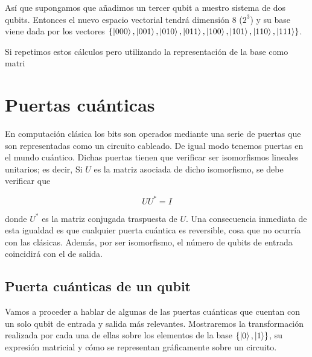Así que supongamos que añadimos un tercer qubit a nuestro sistema de dos qubits. Entonces el nuevo espacio vectorial tendrá dimensión 8 ($2^3$) y su base viene dada por los vectores $\{\left|000\right\rangle,\left|001\right\rangle,\left|010\right\rangle,\left|011\right\rangle,\left|100\right\rangle,\left|101\right\rangle,\left|110\right\rangle,\left|111\right\rangle\}$.

Si repetimos estos cálculos pero utilizando la representación de la base como matri


\section{Puertas cuánticas}

En computación clásica los bits son operados mediante una serie de puertas que son representadas como un circuito cableado. De igual modo tenemos puertas en el mundo cuántico. Dichas puertas tienen que verificar ser isomorfismos lineales unitarios; es decir, Si $U$ es la matriz asociada de dicho isomorfismo, se debe verificar que

\begin{equation}
UU^*=I
\end{equation}

donde $U^*$ es la matriz conjugada traspuesta de $U$. Una consecuencia inmediata de esta igualdad es que cualquier puerta cuántica es reversible, cosa que no ocurría con las clásicas. Además, por ser isomorfismo, el número de qubits de entrada coincidirá con el de salida.

\subsection{Puerta cuánticas de un qubit}

Vamos a proceder a hablar de algunas de las puertas cuánticas que cuentan con un solo qubit de entrada y salida más relevantes. Mostraremos la transformación realizada por cada una de ellas sobre los elementos de la base $\{\left|0\right\rangle,\left|1\right\rangle\}$, su expresión matricial y cómo se representan gráficamente sobre un circuito.

